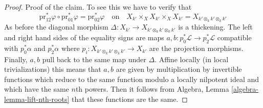 \documentclass{stacks-project}
\theoremstyle{plain}
\theoremstyle{definition}
\theoremstyle{remark}
\numberwithin{equation}{subsection}
\begin{document}
\begin{proof}
\medskip\noindent
Proof of the claim. To see this we have to verify that
$$
\text{pr}_{12}^*\varphi \circ
\text{pr}_{01}^*\varphi =
\text{pr}_{02}^*\varphi
\quad\text{on}\quad
X_{k'} \times_X X_{k'} \times_X X_{k'} = X_{k' \otimes_k k' \otimes_k k'}
$$
As before the diagonal morphism
$\Delta : X_{k'} \to X_{k' \otimes_k k' \otimes_k k'}$
is a thickening. The left and right hand sides of the equality signs
are maps $a, b : p_0^*\mathcal{L} \to p_2^*\mathcal{L}$ compatible with
$p_0^*\alpha$ and $p_2^*\alpha$ where
$p_i : X_{k' \otimes_k k' \otimes_k k'} \to X_{k'}$
are the projection morphisms. Finally, $a, b$ pull back to the
same map under $\Delta$.
Affine locally (in local trivializations) this means that
$a, b$ are given by multiplication by invertible functions
which reduce to the same function modulo a locally nilpotent
ideal and which have the same $n$th powers. Then it follows
from Algebra, Lemma \ref{algebra-lemma-lift-nth-roots}
that these functions are the same.
\end{proof}









\end{document}
